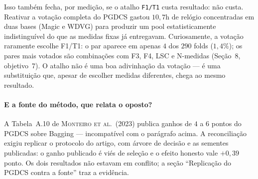 Isso também fecha, por medição, se o atalho \texttt{F1/T1} custa resultado: não
custa. Reativar a votação completa do PGDCS gastou $10{,}7$h de relógio
concentradas em duas bases (Magic e WDVG) para produzir um pool
estatisticamente indistinguível do que as medidas fixas já entregavam. Curiosamente,
a votação raramente escolhe F1/T1: o par aparece em apenas $4$ dos $290$ folds
($1{,}4\%$); os pares mais votados são combinações com F3, F4, LSC e N-medidas
(Seção~8, objetivo~7). O atalho não é uma boa adivinhação da votação --- é uma
substituição que, apesar de escolher medidas diferentes, chega ao mesmo resultado.

\paragraph{E a fonte do método, que relata o oposto?} A Tabela~A.10 de
\textsc{Monteiro et al.}~(2023) publica ganhos de $4$ a $6$ pontos do PGDCS sobre
Bagging --- incompatível com o parágrafo acima. A reconciliação exigiu replicar o
protocolo do artigo, com árvore de decisão e as sementes publicadas: o ganho
publicado é viés de seleção e o efeito honesto vale $+0{,}39$ ponto. Os dois
resultados não estavam em conflito; a seção ``Replicação do PGDCS contra a fonte''
traz a evidência.
